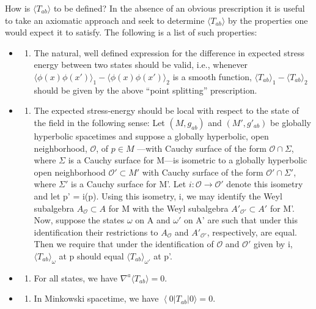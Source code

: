 \documentclass[11pt,a4paper]{article}
\providecommand{\tightlist}{\setlength{\itemsep}{0pt}\setlength{\parskip}{0pt}}
\providecommand{\bra}[1]{\left\langle#1\right\rvert}
\begin{document}
\hypertarget{source-102}{}

How is \(\langle T_{ab}\rangle \) to be defined? In the absence of an obvious prescription it is useful to take an axiomatic approach and seek to determine \(\langle T_{ab}\rangle \) by the properties one would expect it to satisfy. The following is a list of such properties:

\begin{itemize}
\item
  \begin{enumerate}
  \def\labelenumi{\arabic{enumi})}
  \tightlist
  \item
    The natural, well defined expression for the difference in expected stress energy between two states should be valid, i.e., whenever \(\langle \phi(x)\phi(x')\rangle _1-\langle \phi(x)\phi(x')\rangle _2\) is a smooth function, \(\langle T_{ab}\rangle _1-\langle T_{ab}\rangle _2\) should be given by the above ``point splitting'' prescription.
  \end{enumerate}
\item
  \begin{enumerate}
  \def\labelenumi{\arabic{enumi})}
  \setcounter{enumi}{1}
  \tightlist
  \item
    The expected stress-energy should be local with respect to the state of the field in the following sense: Let \((M, g_{ab})\) and \((M', g'_{ab})\) be globally hyperbolic spacetimes and suppose a globally hyperbolic, open neighborhood, \(\mathcal O\), of \(p \in M\) ---with Cauchy surface of the form \(\mathcal O \cap \Sigma\), where \(\Sigma\) is a Cauchy surface for M---is isometric to a globally hyperbolic open neighborhood \(\mathcal O' \subset M'\) with Cauchy surface of the form \(\mathcal O' \cap \Sigma'\), where \(\Sigma'\) is a Cauchy surface for M'. Let \(i:\mathcal O \to \mathcal O'\) denote this isometry and let p' = i(p). Using this isometry, i, we may identify the Weyl subalgebra \(A _{\mathcal O} \subset A\) for M with the Weyl subalgebra \(A'_{\mathcal O'} \subset A'\) for M'. Now, suppose the states \(\omega\) on A and \(\omega'\) on A' are such that under this identification their restrictions to \(A_{\mathcal O}\) and \(A'_{\mathcal O'}\), respectively, are equal. Then we require that under the identification of \(\mathcal O\) and \(\mathcal O'\) given by i, \(\langle T_{ab}\rangle _{\omega}\) at p should equal \(\langle T_{ab}\rangle _{\omega'}\) at p'.
  \end{enumerate}
\item
  \begin{enumerate}
  \def\labelenumi{\arabic{enumi})}
  \setcounter{enumi}{2}
  \tightlist
  \item
    For all states, we have \(\nabla^a\langle T_{ab}\rangle=0\).
  \end{enumerate}
\item
  \begin{enumerate}
  \def\labelenumi{\arabic{enumi})}
  \setcounter{enumi}{3}
  \tightlist
  \item
    In Minkowski spacetime, we have \(\bra0 T_{ab}\lvert 0\rangle = 0\).
  \end{enumerate}
\end{itemize}
\end{document}
